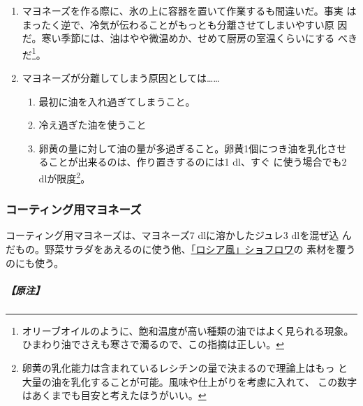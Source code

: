 \begin{recette}
\begin{enumerate}
\def\labelenumi{\arabic{enumi}.}
\setcounter{enumi}{1}
\item
  マヨネーズを作る際に、氷の上に容器を置いて作業するも間違いだ。事実
  はまったく逆で、冷気が伝わることがもっとも分離させてしまいやすい原
  因だ。寒い季節には、油はやや微温めか、せめて厨房の室温くらいにする
  べきだ\footnote{オリーブオイルのように、飽和温度が高い種類の油ではよく見られる現象。ひまわり油でさえも寒さで濁るので、この指摘は正しい。}。
\item
  マヨネーズが分離してしまう原因としては\ldots{}\ldots{}

  \begin{enumerate}
  \def\labelenumii{\arabic{enumii}.}
  \tightlist
  \item
    最初に油を入れ過ぎてしまうこと。
  \item
    冷え過ぎた油を使うこと
  \item
    卵黄の量に対して油の量が多過ぎること。卵黄1個につき油を乳化させ
    ることが出来るのは、作り置きするのには1\troisquarts{} dl、すぐ
    に使う場合でも2 dlが限度\footnote{卵黄の乳化能力は含まれているレシチンの量で決まるので理論上はもっ
      と大量の油を乳化することが可能。風味や仕上がりを考慮に入れて、
      この数字はあくまでも目安と考えたほうがいい。}。
  \end{enumerate}
\end{enumerate}

\hypertarget{mayonnaise-collee}{%
\subsubsection{コーティング用マヨネーズ}\label{mayonnaise-collee}}



コーティング用マヨネーズは、マヨネーズ7 dlに溶かしたジュレ3 dlを混ぜ込
んだもの。野菜サラダをあえるのに使う他、\protect\hyperlink{}{「ロシア風」ショフロワ}の
素材を覆うのにも使う。

\hypertarget{nota-mayonnaise-collee}{%
\subparagraph{【原注】}\label{nota-mayonnaise-collee}}


\end{recette}
